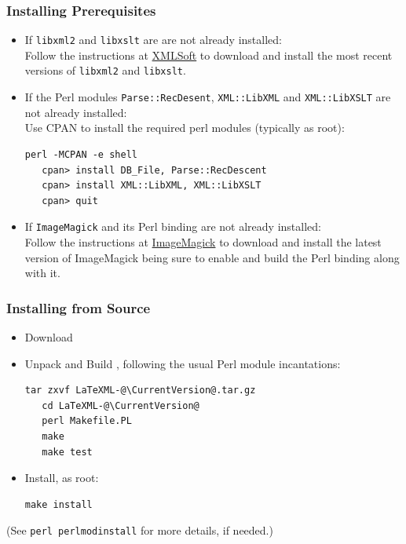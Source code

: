 \documentclass{article}
\begin{document}
\subsubsection{Installing Prerequisites}\label{install.prerequisites}
\begin{itemize}
\item If \texttt{libxml2} and \texttt{libxslt} are are not already installed:\\
  Follow the instructions at \href{http://www.xmlsoft.org}{XMLSoft} to
  download and install the most recent versions of \texttt{libxml2} and \texttt{libxslt}.
\item If the Perl modules \texttt{Parse::RecDesent}, \texttt{XML::LibXML}
 and \texttt{XML::LibXSLT} are not already installed:\\
 Use CPAN to install the required perl modules (typically as root):
\begin{lstlisting}[style=shell]
   perl -MCPAN -e shell
   cpan> install DB_File, Parse::RecDescent
   cpan> install XML::LibXML, XML::LibXSLT
   cpan> quit
\end{lstlisting}
\item If \texttt{ImageMagick} and its Perl binding are not already installed:\\
  Follow the instructions at \href{http://www.imagemagick.org/}{ImageMagick}
  to download and install the latest version of ImageMagick being sure to enable
  and build the Perl binding along with it.
\end{itemize}

\subsubsection{Installing from Source}\label{install.source}
\begin{itemize}
\item Download \CurrentTarball
\item Unpack and Build \LaTeXML, following the usual Perl module incantations:
\begin{lstlisting}[style=shell]
   tar zxvf LaTeXML-@\CurrentVersion@.tar.gz
   cd LaTeXML-@\CurrentVersion@
   perl Makefile.PL
   make
   make test
\end{lstlisting}
\item Install, as root:
\begin{lstlisting}[style=shell]
   make install
\end{lstlisting}
\end{itemize}
(See \texttt{perl perlmodinstall} for more details, if needed.)
\end{document}
